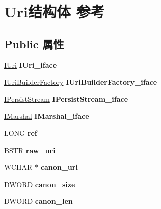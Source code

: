 \hypertarget{struct_uri}{}\section{Uri结构体 参考}
\label{struct_uri}
\subsection*{Public 属性}
\begin{DoxyCompactItemize}
\item 
\mbox{\label{struct_uri_a5074dfadb3c37abc06f03a8db150abf6}} 
\hyperlink{interface_i_uri}{I\+Uri} {\bfseries I\+Uri\+\_\+iface}
\item 
\mbox{\label{struct_uri_a419b3fc399c612a8bd3bac9f591070a1}} 
\hyperlink{interface_i_uri_builder_factory}{I\+Uri\+Builder\+Factory} {\bfseries I\+Uri\+Builder\+Factory\+\_\+iface}
\item 
\mbox{\label{struct_uri_a94273533e01f51f7be4ea600c260b44b}} 
\hyperlink{interface_i_persist_stream}{I\+Persist\+Stream} {\bfseries I\+Persist\+Stream\+\_\+iface}
\item 
\mbox{\label{struct_uri_a714031c7cd4fa311daba1547497875f2}} 
\hyperlink{interface_i_marshal}{I\+Marshal} {\bfseries I\+Marshal\+\_\+iface}
\item 
\mbox{\label{struct_uri_a337efe93c527cc4f6ba535a023f100c0}} 
L\+O\+NG {\bfseries ref}
\item 
\mbox{\label{struct_uri_a236794e5491cefa97147eb700e98f909}} 
B\+S\+TR {\bfseries raw\+\_\+uri}
\item 
\mbox{\label{struct_uri_a73debb20e14cfc4b6f1c59854c469c7b}} 
W\+C\+H\+AR $\ast$ {\bfseries canon\+\_\+uri}
\item 
\mbox{\label{struct_uri_aa90b9c989d15a4645f20418306fc4c75}} 
D\+W\+O\+RD {\bfseries canon\+\_\+size}
\item 
\mbox{\label{struct_uri_a5a13a89ee94689aca4f1233305024cb9}} 
D\+W\+O\+RD {\bfseries canon\+\_\+len}
\item 
\mbox{\label{struct_uri_aeee82471af7f0a954eb34fa696ff34de}} 

\end{DoxyCompactItemize}
